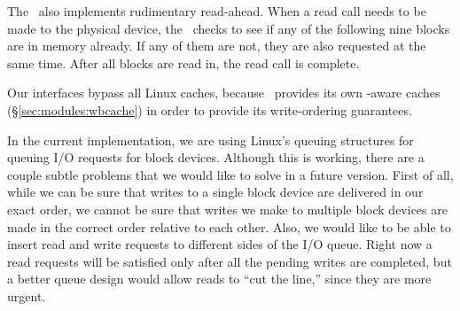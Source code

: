 The \module\ also implements rudimentary read-ahead. When a read call needs to
be made to the physical device, the \module\ checks to see if any of the
following nine blocks are in memory already. If any of them are not, they are
also requested at the same time. After all blocks are read in, the read call is
complete.

Our interfaces bypass all Linux caches, because \Kudos\ provides its own
\chdesc-aware caches (\S\ref{sec:modules:wbcache}) in order to provide its
write-ordering guarantees.

In the current implementation, we are using Linux's queuing structures for
queuing I/O requests for block devices. Although this is working, there are a
couple subtle problems that we would like to solve in a future version. First of
all, while we can be sure that writes to a single block device are delivered in
our exact order, we cannot be sure that writes we make to multiple block devices
are made in the correct order relative to each other. Also, we would like to be
able to insert read and write requests to different sides of the I/O queue.
Right now a read requests will be satisfied only after all the pending writes
are completed, but a better queue design would allow reads to ``cut the line,''
since they are more urgent.
